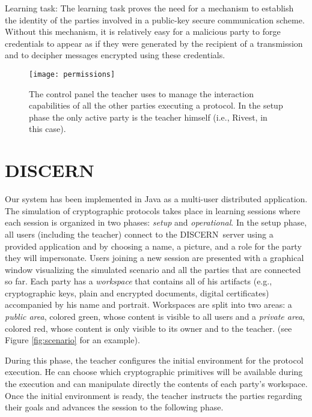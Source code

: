 \documentclass[conference]{IEEEtran}
\def\disgrace{DISCERN}
\begin{document}
{\sc Learning task:} The learning task proves the need
for a mechanism to establish the identity of the parties
involved in a public-key secure communication scheme.
Without this mechanism, it is relatively easy for
a malicious party to forge credentials to appear as if
they were generated by the recipient of a transmission
and to decipher messages encrypted using these credentials.

\begin{figure*}
\centering
\texttt{[image: permissions]}
\caption{The control panel the teacher uses to manage the interaction
  capabilities of all the other parties executing a protocol. In the
  setup phase the only active party is the teacher himself (i.e.,
  Rivest, in this case).}
\label{fig:permissions}
\end{figure*}


\section{DISCERN}
\label{sec:dgrace}
Our system has been implemented in Java as a multi-user distributed
application. The simulation of cryptographic protocols takes place in
learning sessions where each session is organized in two phases:
{\em setup} and {\em operational}. In the setup phase, all users
(including the teacher) connect to the \disgrace\ server using
a provided application and by choosing a name, a picture, and a
role for the party they will impersonate.  Users joining a new
session are presented with a graphical window visualizing
the simulated scenario and all the parties that are connected so far.
Each party has a {\em workspace} that contains all of his artifacts
(e.g., cryptographic keys, plain and encrypted documents, digital
certificates) accompanied by his name and portrait.
Workspaces are split into two areas: a {\em public area},
colored green, whose content is visible to all users and
a {\em private area}, colored red, whose content is only
visible to its owner and to the teacher. (see Figure \ref{fig:scenario} for an example).

During this phase, the teacher configures the initial environment
for the protocol execution. He can choose which cryptographic
primitives will be available during the execution and can manipulate
directly the contents of each party's workspace. Once the initial
environment is ready, the teacher instructs the parties regarding their goals and advances the session to the following phase.
\end{document}
